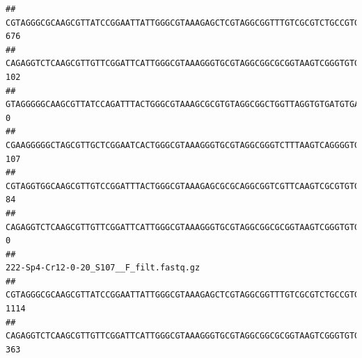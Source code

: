 \documentclass[]{article}
\begin{document}
\begin{verbatim}
## CGTAGGGCGCAAGCGTTATCCGGAATTATTGGGCGTAAAGAGCTCGTAGGCGGTTTGTCGCGTCTGCCGTGAAAGTCCGGGGCTCAACTCCGGATCTGCGGTGGGTACGGGCAGACTAGAGTGATGTAGGGGAGACTGGAATTCCTGGTGTAGCGGTGAAATGCGCAGATATCAGGAGGAACACCGATGGCGAAGGCAGGTCTCTGGGCATTAACTGACGCTGAGGAGCGAAAGCATGGGGAGCGAACA                                     676
## CAGAGGTCTCAAGCGTTGTTCGGATTCATTGGGCGTAAAGGGTGCGTAGGCGGCGCGGTAAGTCGGGTGTGAAATCTCGGAGCTTAACTCCGAAACTGCATTCGATACTGCCGTGCTTGAGGACTGGAGAGGAGACTGGAATTTACGGTGTAGCGGTGAAATGCGTAGATATCGTAAGGAAGACCAGTGGCGAAGGCGGGTCTCTGGACAGTTCCTGACGCTGAGGCACGAAGGCCAGGGGAGCAAACG                                     102
## GTAGGGGGCAAGCGTTATCCAGATTTACTGGGCGTAAAGCGCGTGTAGGCGGCTGGTTAGGTGTGATGTGAAATCTTCCGGCTCAACCGGAAAACTGCATTGCAAACCGGCCTGGCTAGAGTGCAGGAGAGGGAAGCGGAATTCCAGGTGTAGCGGTGAAATGCGTAGATATCTGGAGGAACACCAGTGGCGAAGGCGGCTTCCTGGCCTGCAACTGACGCTGAGACGCGAAAGCGTGGGGAGCGAAC                                        0
## CGAAGGGGGCTAGCGTTGCTCGGAATCACTGGGCGTAAAGGGTGCGTAGGCGGGTCTTTAAGTCAGGGGTGAAATCCTGGAGCTCAACTCCAGAACTGCCTTTGATACTGAAGATCTTGAGTTCGGGAGAGGTGAGTGGAACTGCGAGTGTAGAGGTGAAATTCGTAGATATTCGCAAGAACACCAGTGGCGAAGGCGGCTCACTGGCCCGATACTGACGCTGAGGCACGAAAGCGTGGGGAGCAAACA                                     107
## CGTAGGTGGCAAGCGTTGTCCGGATTTACTGGGCGTAAAGAGCGCGCAGGCGGTCGTTCAAGTCGCGTGTGAAAGCCCCCGGCTCAACTGGGGAGGGTCACGCGATACTGATCGACTCGAAGGCAGGAGAGGGTAGTGGAATTCCCGGTGTAGTGGTGAAATGCGTAGATATCGGGAGGAACACCAGTGGCGAAGGCGACTACCTGGCCTGTTCTTGACGCTGAGGCGCGAAAGCTAGGGGAGCAAACG                                      84
## CAGAGGTCTCAAGCGTTGTTCGGATTCATTGGGCGTAAAGGGTGCGTAGGCGGCGCGGTAAGTCGGGTGTGAAATCTCGGGGCTTAACTCCGAAACTGCATTCGATACTGCCGTGCTTGAGGACTGGAGAGGAGACTGGAATTTACGGTGTAGCGGTGAAATGCGTAGATATCGTAAGGAAGACCAGTGGCGAAGGCGGGTCTCTGGACAGTTCCTGACGCTGAGGCACGAAGGCCAGGGGAGCAAACG                                       0
##                                                                                                                                                                                                                                                           222-Sp4-Cr12-0-20_S107__F_filt.fastq.gz
## CGTAGGGCGCAAGCGTTATCCGGAATTATTGGGCGTAAAGAGCTCGTAGGCGGTTTGTCGCGTCTGCCGTGAAAGTCCGGGGCTCAACTCCGGATCTGCGGTGGGTACGGGCAGACTAGAGTGATGTAGGGGAGACTGGAATTCCTGGTGTAGCGGTGAAATGCGCAGATATCAGGAGGAACACCGATGGCGAAGGCAGGTCTCTGGGCATTAACTGACGCTGAGGAGCGAAAGCATGGGGAGCGAACA                                    1114
## CAGAGGTCTCAAGCGTTGTTCGGATTCATTGGGCGTAAAGGGTGCGTAGGCGGCGCGGTAAGTCGGGTGTGAAATCTCGGAGCTTAACTCCGAAACTGCATTCGATACTGCCGTGCTTGAGGACTGGAGAGGAGACTGGAATTTACGGTGTAGCGGTGAAATGCGTAGATATCGTAAGGAAGACCAGTGGCGAAGGCGGGTCTCTGGACAGTTCCTGACGCTGAGGCACGAAGGCCAGGGGAGCAAACG                                     363

\end{verbatim}
\end{document}
